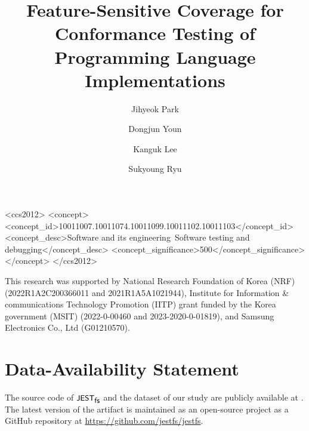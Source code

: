 \documentclass[acmsmall,screen]{acmart}
\begin{document}
\title[Feature-Sensitive Coverage for Conformance Testing]
{Feature-Sensitive Coverage for Conformance Testing of Programming Language
Implementations}

\author{Jihyeok Park}

\author{Dongjun Youn}

\author{Kanguk Lee}

\author{Sukyoung Ryu}



\begin{CCSXML}
  <ccs2012>
  <concept>
  <concept_id>10011007.10011074.10011099.10011102.10011103</concept_id>
  <concept_desc>Software and its engineering~Software testing and debugging</concept_desc>
  <concept_significance>500</concept_significance>
  </concept>
  </ccs2012>
\end{CCSXML}



\maketitle









\begin{acks}
This research was supported by National Research Foundation of Korea (NRF)
(2022R1A2C200366011 and 2021R1A5A1021944), Institute for Information \&
communications Technology Promotion (IITP) grant funded by the Korea government
(MSIT) (2022-0-00460 and 2023-2020-0-01819), and Samsung Electronics Co., Ltd
(G01210570).
\end{acks}

\section*{Data-Availability Statement}\label{sec:data}

The source code of $\textsf{\small JEST}_{\textsf{\small fs}}$ and the dataset of our study are publicly available
at \cite{artifact}. The latest version of the artifact is maintained as an
open-source project as a GitHub repository at
\url{https://github.com/jestfs/jestfs}.

\balance

\end{document}
